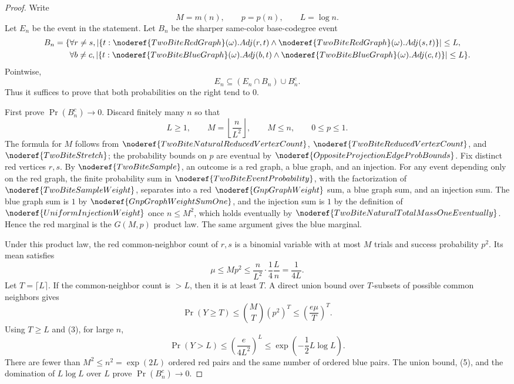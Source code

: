 \begin{proof}
Write
\[
M=m(n),\qquad p=p(n),\qquad L=\log n.
\]
Let \(E_n\) be the event in the statement.  Let \(B_n\) be the sharper
same-color base-codegree event
\[
\begin{aligned}
B_n=\{&
\forall r\ne s,
|\{t:\noderef{TwoBiteRedGraph}(\omega).Adj(r,t)\land
\noderef{TwoBiteRedGraph}(\omega).Adj(s,t)\}|\le L,\\
&\forall b\ne c,
|\{t:\noderef{TwoBiteBlueGraph}(\omega).Adj(b,t)\land
\noderef{TwoBiteBlueGraph}(\omega).Adj(c,t)\}|\le L\}.
\end{aligned}
\]
Pointwise,
\[
E_n\subseteq (E_n\cap B_n)\cup B_n^c.
\tag{1}
\]
Thus it suffices to prove that both probabilities on the right tend to
\(0\).

First prove \(\Pr(B_n^c)\to0\).  Discard finitely many \(n\) so that
\[
L\ge1,\qquad M=\left\lfloor \frac n{L^2}\right\rfloor,\qquad
M\le n,\qquad 0\le p\le1.
\tag{2}
\]
The formula for \(M\) follows from \(\noderef{TwoBiteNaturalReducedVertexCount}\),
\(\noderef{TwoBiteReducedVertexCount}\), and \(\noderef{TwoBiteStretch}\);
the probability bounds on \(p\) are eventual by
\(\noderef{OppositeProjectionEdgeProbBounds}\).  Fix distinct red vertices
\(r,s\).  By \(\noderef{TwoBiteSample}\), an outcome is a red graph, a blue
graph, and an injection.  For any event depending only on the red graph, the
finite probability sum in \(\noderef{TwoBiteEventProbability}\), with the
factorization of \(\noderef{TwoBiteSampleWeight}\), separates into a red
\(\noderef{GnpGraphWeight}\) sum, a blue graph sum, and an injection sum.
The blue graph sum is \(1\) by \(\noderef{GnpGraphWeightSumOne}\), and the
injection sum is \(1\) by the definition of \(\noderef{UniformInjectionWeight}\)
once \(n\le M^2\), which holds eventually by
\(\noderef{TwoBiteNaturalTotalMassOneEventually}\).  Hence the red marginal
is the \(G(M,p)\) product law.  The same argument gives the blue marginal.

Under this product law, the red common-neighbor count of \(r,s\) is a binomial
variable with at most \(M\) trials and success probability \(p^2\).  Its mean
satisfies
\[
\mu\le Mp^2
\le \frac n{L^2}\cdot \frac14\frac Ln
=\frac1{4L}.
\tag{3}
\]
Let \(T=\lceil L\rceil\).  If the common-neighbor count is \(>L\), then it is
at least \(T\).  A direct union bound over \(T\)-subsets of possible common
neighbors gives
\[
\Pr(Y\ge T)\le \binom MT(p^2)^T
\le \left(\frac{e\mu}{T}\right)^T.
\tag{4}
\]
Using \(T\ge L\) and (3), for large \(n\),
\[
\Pr(Y>L)\le
\left(\frac{e}{4L^2}\right)^L
\le \exp\!\left(-\frac12L\log L\right).
\tag{5}
\]
There are fewer than \(M^2\le n^2=\exp(2L)\) ordered red pairs and the same
number of ordered blue pairs.  The union bound, (5), and the domination of
\(L\log L\) over \(L\) prove \(\Pr(B_n^c)\to0\).


\end{proof}
